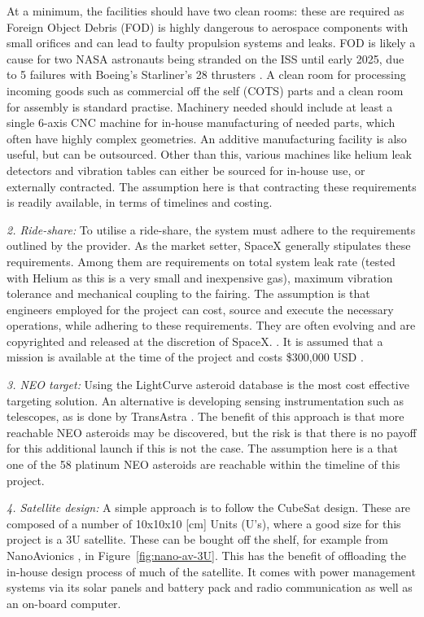 \documentclass[conference]{IEEEtran}
\begin{document}
At a minimum, the facilities should have two clean rooms: these are required as Foreign Object Debris (FOD) is highly dangerous to aerospace components with small orifices and can lead to faulty propulsion systems and leaks. FOD is likely a cause for two NASA astronauts being stranded on the ISS until early 2025, due to 5 failures with Boeing's Starliner's 28 thrusters \cite{rnz-news-2024}. A clean room for processing incoming goods such as commercial off the self (COTS) parts and a clean room for assembly is standard practise. Machinery needed should include at least a single 6-axis CNC machine for in-house manufacturing of needed parts, which often have highly complex geometries. An additive manufacturing facility is also useful, but can be outsourced. Other than this, various machines like helium leak detectors and vibration tables can either be sourced for in-house use, or externally contracted. The assumption here is that contracting these requirements is readily available, in terms of timelines and costing.

\textit{2. Ride-share:}
To utilise a ride-share, the system must adhere to the requirements outlined by the provider. As the market setter, SpaceX generally stipulates these requirements. Among them are requirements on total system leak rate (tested with Helium as this is a very small and inexpensive gas), maximum vibration tolerance and mechanical coupling to the fairing. The assumption is that engineers employed for the project can cost, source and execute the necessary operations, while adhering to these requirements. They are often evolving and are copyrighted and released at the discretion of SpaceX. \cite{rocket-lab-usa-inc-2022}. It is assumed that a mission is available at the time of the project and costs \$300,000 USD \cite{spacex-rideshare-cost-2025}.

\textit{3. NEO target:}
Using the LightCurve asteroid database \cite{lightcurve-db} is the most cost effective targeting solution. An alternative is developing sensing instrumentation such as telescopes, as is done by TransAstra \cite{transastra-2023}. The benefit of this approach is that more reachable NEO asteroids may be discovered, but the risk is that there is no payoff for this additional launch if this is not the case. The assumption here is a that one of the 58 platinum NEO asteroids are reachable within the timeline of this project.

\textit{4. Satellite design:}
A simple approach is to follow the CubeSat design. These are composed of a number of 10x10x10 [cm] Units (U's), where a good size for this project is a 3U satellite. These can be bought off the shelf, for example from NanoAvionics \cite{nanoavionics-2023}, in Figure~\ref{fig:nano-av-3U}. This has the benefit of offloading the in-house design process of much of the satellite. It comes with power management systems via its solar panels and battery pack and radio communication as well as an on-board computer. 
\end{document}
